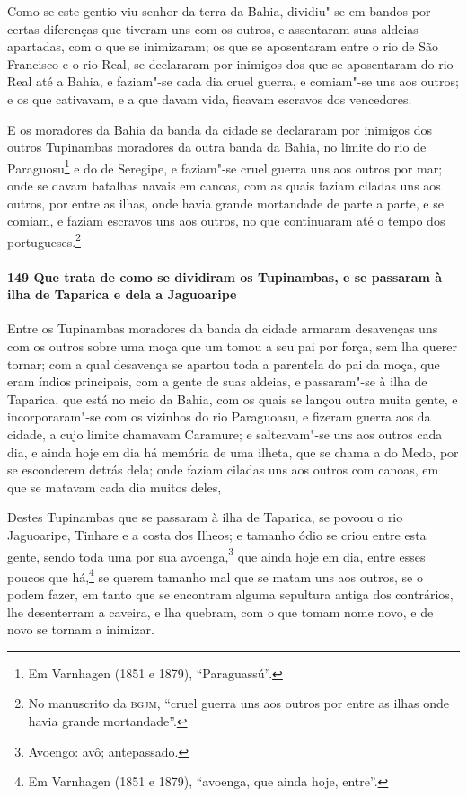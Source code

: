 \begin{linenumbers}
Como se este gentio viu senhor da terra da Bahia, dividiu"-se em bandos por certas
diferenças que tiveram uns com os outros, e assentaram suas aldeias apartadas, com o que
se inimizaram; os que se aposentaram entre o rio de São Francisco e o rio Real, se
declararam por inimigos dos que se aposentaram do rio Real até a Bahia, e faziam"-se cada
dia cruel guerra, e comiam"-se uns aos outros; e os que cativavam, e a que davam vida,
ficavam escravos dos vencedores.

E os moradores da Bahia da banda da cidade se declararam por inimigos dos outros
Tupinambas moradores da outra banda da Bahia, no limite do rio de Paraguosu\footnote{ Em
Varnhagen (1851 e 1879), ``Paraguassú''.} e do de Seregipe, e faziam"-se cruel guerra uns
aos outros por mar; onde se davam batalhas navais em canoas, com as quais faziam ciladas
uns aos outros, por entre as ilhas, onde havia grande mortandade de parte a parte, e se
comiam, e faziam escravos uns aos outros, no que continuaram até o tempo dos
portugueses.\footnote{ No manuscrito da \textsc{bgjm}, ``cruel guerra uns aos outros por
entre as ilhas onde havia grande mortandade''.}

\paragraph{149 Que trata de como se dividiram os Tupinambas, e se passaram à ilha de
Taparica e dela a Jaguoaripe}\quad
Entre os Tupinambas moradores da banda da cidade armaram desavenças uns com os outros
sobre uma moça que um tomou a seu pai por força, sem lha querer tornar; com a qual
desavença se apartou toda a parentela do pai da moça, que eram índios principais, com a
gente de suas aldeias, e passaram"-se à ilha de Taparica, que está no meio da Bahia, com os
quais se lançou outra muita gente, e incorporaram"-se com os vizinhos do rio Paraguoasu, e
fizeram guerra aos da cidade, a cujo limite chamavam Caramure; e salteavam"-se uns aos
outros cada dia, e ainda hoje em dia há memória de uma ilheta, que se chama a do Medo, por
se esconderem detrás dela; onde faziam ciladas uns aos outros com canoas, em que se
matavam cada dia muitos deles,

Destes Tupinambas que se passaram à ilha de Taparica, se povoou o rio Jaguoaripe, Tinhare
e a costa dos Ilheos; e tamanho ódio se criou entre esta gente, sendo toda uma por sua
avoenga,\footnote{ Avoengo: avô; antepassado.} que ainda hoje em dia, entre esses poucos
que há,\footnote{ Em Varnhagen (1851 e 1879), ``avoenga, que ainda hoje, entre''.} se
querem tamanho mal que se matam uns aos outros, se o podem fazer, em tanto que se
encontram alguma sepultura antiga dos contrários, lhe desenterram a caveira, e lha
quebram, com o que tomam nome novo, e de novo se tornam a inimizar.


\end{linenumbers}
